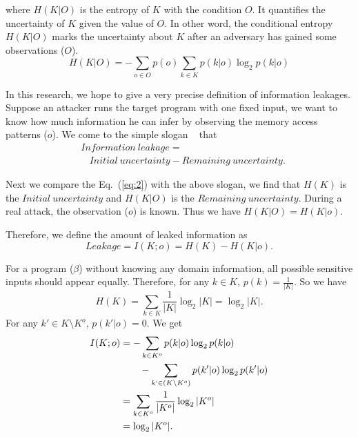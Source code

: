\noindent where $H(K|O)$ is the entropy of $K$ with the condition $O$. It quantifies the
uncertainty of $K$ given the value of $O$. In other word, the conditional
entropy $H(K|O)$ marks the uncertainty about $K$ after an adversary has gained
some observations ($O$).
\begin{equation}
    H(K|O) = - \sum_{o {\in} O} {p(o) \sum_{k {\in} K}{p(k|o)\log_2p(k|o)}}
\end{equation}

In this research, we hope to give a very precise definition of information
leakages. Suppose an attacker runs the target program with one
fixed input, we want to know how much information he can infer by observing the
memory access patterns ($o$). We come to the simple slogan
~\cite{10.1007/978-3-642-00596-1_21} %
that
\begin{align*}
     & \mathit{Information\ leakage} =                                       \\
     & ~~~~ \mathit{Initial\ uncertainty} - \mathit{Remaining\ uncertainty}.
\end{align*}

Next we compare the Eq.~(\ref{eq:2}) with the above slogan, we find that $H(K)$
is the $\mathit{Initial\ uncertainty}$ and $H(K|O)$ is the $\mathit{Remaining\
        uncertainty}$. During a real attack, the observation ($o$) is known.  Thus we
have $H(K|O) = H(K|o)$.

Therefore, we define the amount of leaked information as
\begin{displaymath}
    Leakage = I(K;o) = H(K) - H(K|o).
\end{displaymath}

For a program ($\beta$) without knowing any domain information, all possible sensitive
inputs should appear equally. Therefore, for any $k \in K$, $p(k) =
    \frac{1}{|K|}$. So we have
$$H(K) = \sum_{k {\in} K}\frac{1}{|K|}\log_2{|K|} = \log_2{|K|}.$$
For any $k' \in K \setminus K^o$, $p(k'|o) = 0$. We get
\begin{align*}
    I(K;o) & = - \sum_{k {\in} K^o}{p(k|o)\log_2p(k|o)}                         \\
           & \qquad   - \sum_{k` {\in} (K \setminus K^o)}{p(k'|o)\log_2p(k'|o)} \\
           & = \sum_{k {\in} K^o}\frac{1}{|K^o|}\log_2{|K^o|}                   \\
           & = \log_2{|K^o|}.
\end{align*}


